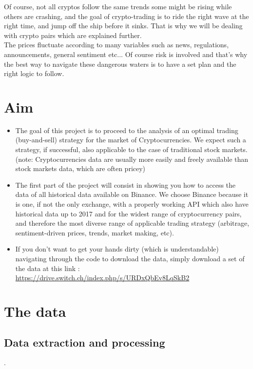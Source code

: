 \documentclass[twoside]{report}
\begin{document}
\begin{spacing}{1}
Of course, not all cryptos follow the same trends some might be rising while others are crashing, and the goal of crypto-trading is to ride the right wave at the right time, and jump off the ship before it sinks. That is why we will be dealing with crypto pairs which are explained further.\\
The prices fluctuate according to many variables such as news, regulations, announcements, general sentiment etc... Of course risk is involved and that's why the best way to navigate these dangerous waters is to have a set plan and the right logic to follow.







\section{Aim}
\begin{itemize}
    \item 
The goal of this project is to proceed to the analysis of an optimal trading (buy-and-sell) strategy for the market of Cryptocurrencies. We expect such a strategy, if successful, also applicable to the case of traditional stock markets. (note: Cryptocurrencies data are usually more easily and freely available than stock markets data, which are often pricey)
    \item
The first part of the project will consist in showing you how to access the data of all historical data available on Binance. We choose Binance because it is one, if not the only exchange, with a properly working API which also have historical data up to 2017 and for the widest range of cryptocurrency pairs, and therefore the most diverse range of applicable trading strategy (arbitrage, sentiment-driven prices, trends, market making, etc).
    \item{
If you don't want to get your hands dirty (which is understandable) navigating through the code to download the data, simply download a set of the data at this link : \url{https://drive.switch.ch/index.php/s/URDxQbEv8LqSkB2}}

\end{itemize}



\section{The data}
\subsection{Data extraction and processing}
.


\end{spacing}
\end{document}

